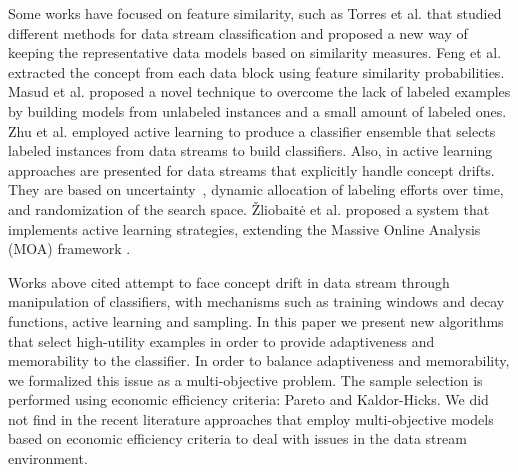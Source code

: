 Some works have focused on feature similarity, such as Torres et al.
\cite{Torres:2011:CMD:2025756.2025758} that studied different methods for data
stream classification and proposed a new way of keeping the representative
data models based on similarity measures.
Feng et al. \cite{Feng2013} extracted the
concept from each data block using feature similarity
probabilities. 
Masud et al. \cite{Masud:2008:PAC:1510528.1511337} proposed a novel technique
to overcome the lack of labeled examples by building models
from unlabeled instances and a small amount of labeled ones.
Zhu et al. \cite{5440901} employed active learning to produce a
classifier ensemble that selects labeled instances from data streams to
build classifiers. Also, in \cite{6414645,Indre2011k} active
learning approaches are presented for data streams that explicitly handle
concept drifts. They are based on uncertainty~\cite{uncertainty}, dynamic allocation 
of labeling efforts over time, and randomization of the search space. \v{Z}liobait\.{e} et
al.  \cite{DBLP:journals/jmlr/ZliobaiteBHP11} proposed a system that implements active
learning strategies, extending the Massive Online Analysis (MOA) framework \cite{moa}.

Works above cited attempt to face concept drift in data stream through manipulation of
classifiers, with mechanisms such as training windows and decay functions,
active learning and sampling. In this paper we present new algorithms that
select high-utility examples in order to provide adaptiveness and memorability
to the classifier. In order to balance adaptiveness
and memorability, we formalized this issue as a multi-objective problem. The sample
selection is performed using economic efficiency criteria: Pareto and Kaldor-Hicks.
We did not find in the recent literature
approaches that employ multi-objective models based on economic efficiency criteria to
deal with issues in the data stream environment.
